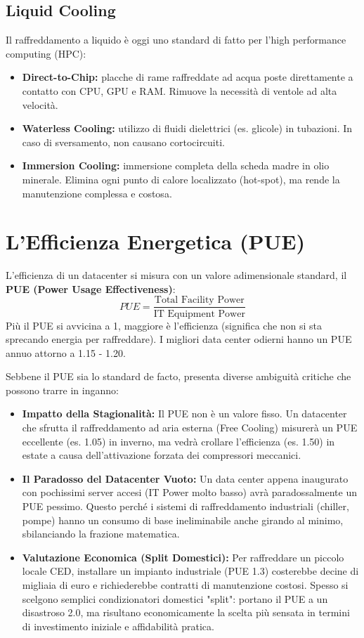 \subsection{Liquid Cooling}
Il raffreddamento a liquido è oggi uno standard di fatto per l'high performance computing (HPC):
\begin{itemize}
    \item \textbf{Direct-to-Chip:} placche di rame raffreddate ad acqua poste direttamente a contatto con CPU, GPU e RAM. Rimuove la necessità di ventole ad alta velocità.
    \item \textbf{Waterless Cooling:} utilizzo di fluidi dielettrici (es. glicole) in tubazioni. In caso di sversamento, non causano cortocircuiti.
    \item \textbf{Immersion Cooling:} immersione completa della scheda madre in olio minerale. Elimina ogni punto di calore localizzato (hot-spot), ma rende la manutenzione complessa e costosa.
\end{itemize}

\section{L'Efficienza Energetica (PUE)}
L'efficienza di un datacenter si misura con un valore adimensionale standard, il \textbf{PUE (Power Usage Effectiveness)}:
\[
PUE = \frac{\text{Total Facility Power}}{\text{IT Equipment Power}}
\]
Più il PUE si avvicina a 1, maggiore è l'efficienza (significa che non si sta sprecando energia per raffreddare). I migliori data center odierni hanno un PUE annuo attorno a 1.15 - 1.20.

\begin{warningbox}
Sebbene il PUE sia lo standard de facto, presenta diverse ambiguità critiche che possono trarre in inganno:
\begin{itemize}
    \item \textbf{Impatto della Stagionalità:} Il PUE non è un valore fisso. Un datacenter che sfrutta il raffreddamento ad aria esterna (Free Cooling) misurerà un PUE eccellente (es. 1.05) in inverno, ma vedrà crollare l'efficienza (es. 1.50) in estate a causa dell'attivazione forzata dei compressori meccanici.
    \item \textbf{Il Paradosso del Datacenter Vuoto:} Un data center appena inaugurato con pochissimi server accesi (IT Power molto basso) avrà paradossalmente un PUE pessimo. Questo perché i sistemi di raffreddamento industriali (chiller, pompe) hanno un consumo di base ineliminabile anche girando al minimo, sbilanciando la frazione matematica.
    \item \textbf{Valutazione Economica (Split Domestici):} Per raffreddare un piccolo locale CED, installare un impianto industriale (PUE 1.3) costerebbe decine di migliaia di euro e richiederebbe contratti di manutenzione costosi. Spesso si scelgono semplici condizionatori domestici "split": portano il PUE a un disastroso 2.0, ma risultano economicamente la scelta più sensata in termini di investimento iniziale e affidabilità pratica.
\end{itemize}
\end{warningbox}


